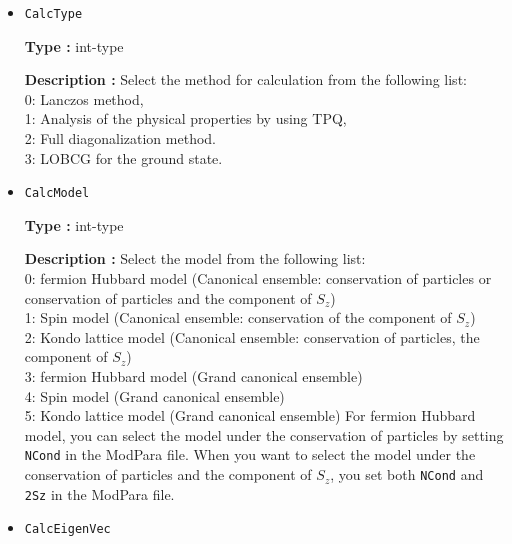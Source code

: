 \begin{itemize}
\item  \verb|CalcType|

{\bf Type :} int-type 

{\bf Description :} Select the method for calculation from the following list:\\
0: Lanczos method,\\
1: Analysis of the physical properties by using TPQ,\\
2: Full diagonalization method.\\
3: LOBCG for the ground state.


\item  \verb|CalcModel|

{\bf Type :} int-type 

{\bf Description :} Select the model from the following list:\\
0: fermion Hubbard model (Canonical ensemble: {conservation of particles or} conservation of particles and the component of $S_z$)\\
1: Spin model (Canonical ensemble: conservation of the component of $S_z$)\\
2: Kondo lattice model (Canonical ensemble: conservation of particles, the component of $S_z$)\\
3: fermion Hubbard model (Grand canonical ensemble)\\
4: Spin model (Grand canonical ensemble)\\
5: Kondo lattice model (Grand canonical ensemble)
{For fermion Hubbard model, you can select the model under the conservation of particles by setting} \verb|NCond| {in the ModPara file. When you want to select the model under the conservation of particles and the component of $S_z$, you set both} \verb|NCond| and \verb|2Sz| {in the ModPara file}.
%
%

\item  \verb|CalcEigenVec|


\end{itemize}
